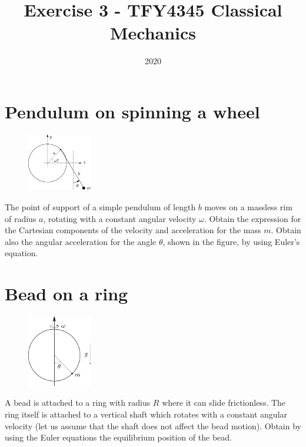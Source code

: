 \documentclass{article}
\title{Exercise 3 - TFY4345 Classical Mechanics}
\date{2020}
\begin{document}
    \maketitle
    \section{Pendulum on spinning a wheel}
    \begin{figure}
        \vspace{-1cm}
        \includegraphics[width=0.25\textwidth]{figures/figure_1.pdf}
        \vspace{-2cm}
    \end{figure}
    The point of support of a simple pendulum of length $b$ moves on a massless rim of radius $a$, rotating with a constant angular velocity $\omega$. Obtain the expression for the Cartesian components of the velocity and acceleration for the mass $m$. Obtain also the angular acceleration for the angle $\theta$, shown in the figure, by using Euler's equation.
    \vspace{1cm}

    \section{Bead on a ring}
    \begin{figure}
        \vspace{-1.5cm}
        \includegraphics[width=0.25\textwidth]{figures/figure_2.pdf}
        \vspace{-2cm}
    \end{figure}
    A bead is attached to a ring with radius $R$ where it can slide frictionless. The ring itself is attached to a vertical shaft which rotates with a constant angular velocity (let us assume that the shaft does not affect the bead motion). Obtain by using the Euler equations the equilibrium position of the bead.
    \vspace{1cm}
\end{document}
